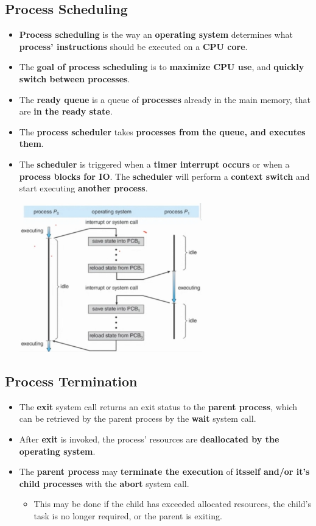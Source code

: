 \documentclass{article}
\begin{document}
    \subsection*{Process Scheduling}
    \begin{itemize}
        \item \textbf{Process scheduling} is the way an \textbf{operating system} determines what \textbf{process' instructions} should be executed on a \textbf{CPU core}.
        \item The \textbf{goal of process scheduling} is to \textbf{maximize CPU use}, and \textbf{quickly switch between processes}.
        \item The \textbf{ready queue} is a queue of \textbf{processes} already in the main memory, that are \textbf{in the ready state}.
        \item The \textbf{process scheduler} takes \textbf{processes from the queue, and executes them}.
        \item The \textbf{scheduler} is triggered when a \textbf{timer interrupt occurs} or when a \textbf{process blocks for IO}. The \textbf{scheduler} will perform a \textbf{context switch} and start executing \textbf{another process}.
        \begin{center}
            \includegraphics[width=300px]{images/Context-Switch.png}
        \end{center}
    \end{itemize}

    \subsection*{Process Termination}
    \begin{itemize}
        \item The \textbf{exit} system call returns an exit status to the \textbf{parent process}, which can be retrieved by the parent process by the \textbf{wait} system call.
        \item After \textbf{exit} is invoked, the process' resources are \textbf{deallocated by the operating system}.
        \item The \textbf{parent process} may \textbf{terminate the execution} of \textbf{itsself and/or it's child processes} with the \textbf{abort} system call.
        \begin{itemize}
            \item This may be done if the child has exceeded allocated resources, the child's task is no longer required, or the parent is exiting.
        \end{itemize}
    \end{itemize}
\end{document}
